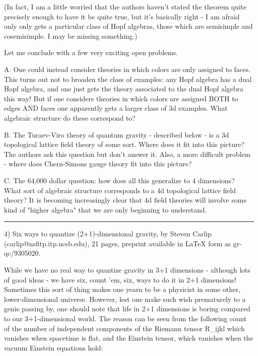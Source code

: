 (In fact, I am a little worried that the authors haven't stated the
theorem quite precisely enough to have it be quite true, but it's
basically right - I am afraid only only gets a particular class of Hopf
algebras, those which are semisimple and cosemisimple.  I may be missing
something.)   

Let me conclude with a few very exciting open problems.

A.  One could instead consider theories in which colors are only
assigned to faces. This turns out not to broaden the class of examples:
any Hopf algebra has a dual Hopf algebra, and one just gets the theory
associated to the dual Hopf algebra this way!  But if one considers
theories in which colors are assigned BOTH to edges AND faces one
apparently gets a larger class of 3d examples.  What algebraic structure
do these correspond to?   

B.  The Turaev-Viro theory of quantum gravity - described below - is a
3d topological lattice field theory of some sort.  Where does it fit
into this picture?  The authors ask this question but don't answer it.
Also, a more difficult problem - where does Chern-Simons gauge theory
fit into this picture? 

C.  The 64,000 dollar question: how does all this generalize to 4
dimensions?  What sort of algebraic structure corresponds to a 4d
topological lattice field theory?  It is becoming increasingly clear
that 4d field theories will involve some kind of "higher algebra" that
we are only beginning to understand.

\par\noindent\rule{\textwidth}{0.4pt}

4) Six ways to quantize (2+1)-dimensional gravity, by Steven Carlip
(carlip@nsfitp.itp.ucsb.edu), 21 pages, preprint available in LaTeX form as
gr-qc/9305020.

While we have no real way to quantize gravity in 3+1 dimensions -
although lots of good ideas - we have six, count 'em, six, ways to do it
in 2+1 dimensions!  Sometimes this sort of thing makes one yearn to be a
physicist in some other, lower-dimensional universe.  However, lest one
make such wish prematurely to a genie passing by, one should note that
life in 2+1 dimensions is boring compared to our 3+1-dimensional world.
The reason can be seen from the following count of the number of
independent components of the Riemann tensor R_{ijkl} which vanishes
when spacetime is flat, and the Einstein tensor, which vanishes when the
vacuum Einstein equations hold:

